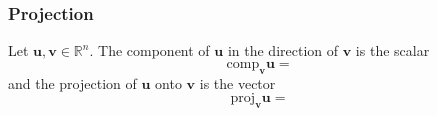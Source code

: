 \documentclass[aspectratio=169]{beamer}
\newcommand{\vectorproj}[2][]{\mathrm{proj}_{\vect{#1}}\vect{#2}}
\newcommand{\vectorcomp}[2][]{\mathrm{comp}_{\vect{#1}}\vect{#2}}
\newcommand{\vect}{\mathbf}
\begin{document}
\begin{frame}
    \frametitle{Projection}
Let $\textbf{u}, \textbf{v}\in \mathbb{R}^n$. The component of $\textbf{u}$ 
in the direction of $\textbf{v}$ is the scalar
\begin{equation*}
\vectorcomp[v]{u} =  
\end{equation*}
and the projection of $\vect{u}$ onto $\vect{v}$ is the vector
\begin{equation*}
    \vectorproj[v]{u}  =
\end{equation*}
\end{frame}
\end{document}
